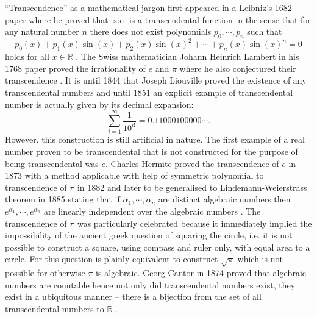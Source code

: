 \documentclass{report}
\theoremstyle{definition}
\begin{document}
``Transcendence'' as a mathematical jargon first appeared in a Leibniz's 1682 paper where he proved that $\sin$ is a transcendental function in the sense that for any natural number $n$ there does not exist polynomials $p_0,\cdots,p_n$ such that
$$p_0(x)+p_1(x)\sin(x)+p_2(x)\sin(x)^2+\cdots+p_n(x)\sin(x)^n=0$$
holds for all $x\in\mathbb R$ \cite{bourbaki1998elements}. The Swiss mathematician Johann Heinrich Lambert in his 1768 paper proved the irrationality of $e$ and $\pi$ where he also conjectured their transcendence \cite{lambert2004memoire}. It is until 1844 that Joseph Liouville proved the existence of any transcendental numbers and until 1851 an explicit example of transcendental number is actually given by its decimal expansion:\cite{10.2307/1988833}
$$\sum_{i=1}^\infty\frac1{10^{i!}}=0.11000100000\cdots.$$
However, this construction is still artificial in nature. The first example of a real number proven to be transcendental that is not constructed for the purpose of being transcendental was $e$. Charles Hermite proved the transcendence of $e$ in 1873 with a method applicable with help of symmetric polynomial to transcendence of $\pi$ in 1882 and later to be generalised to Lindemann-Weierstrass theorem in 1885 stating that if $\alpha_1,\cdots, \alpha_n$ are distinct algebraic numbers then $e^{\alpha_1},\cdots,e^{\alpha_n}$ are linearly independent over the algebraic numbers \cite{baker1990transcendental}. The transcendence of $\pi$ was particularly celebrated because it immediately implied the impossibility of the ancient greek question of squaring the circle, i.e. it is not possible to construct a square, using compass and ruler only, with equal area to a circle. For this question is plainly equivalent to construct $\sqrt\pi$ which is not possible for otherwise $\pi$ is algebraic. Georg Cantor in 1874 proved that algebraic numbers are countable hence not only did transcendental numbers exist, they exist in a ubiquitous manner -- there is a bijection from the set of all transcendental numbers to $\mathbb R$ \cite{cantor1932uber,cantor1878beitrag}.
\end{document}

